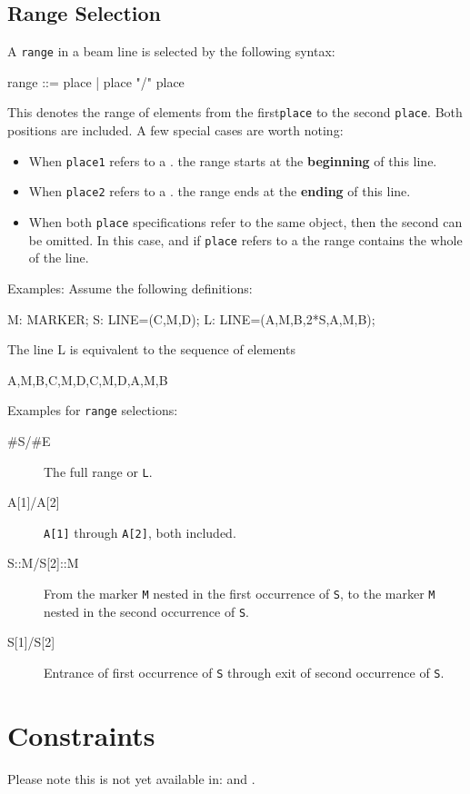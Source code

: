 \subsection{Range Selection}
\label{sec:arange}
A \texttt{range} in a beam line  is selected
by the following syntax:
\begin{example}
range ::= place |
          place "/" place
\end{example}
This denotes the range of elements from the first\texttt{place} to
the second \texttt{place}. Both positions are included.
A few special cases are worth noting:
\begin{itemize}
\item
When \texttt{place1} refers to a  .
the range starts at the \textbf{beginning} of this line.
\item
When \texttt{place2} refers to a  .
the range ends at the \textbf{ending} of this line.
\item
When both \texttt{place} specifications refer to the same object,
then the second can be omitted.
In this case, and if \texttt{place} refers to a
  the range contains the whole of the line.
\end{itemize}
\noindent Examples: Assume the following definitions:
\begin{example}
M: MARKER;
S: LINE=(C,M,D);
L: LINE=(A,M,B,2*S,A,M,B);
\end{example}
The line L is equivalent to the sequence of elements
\begin{example}
A,M,B,C,M,D,C,M,D,A,M,B
\end{example}
\noindent Examples for \texttt{range} selections:
\begin{description}
\item[\#S/\#E]
  The full range or \texttt{L}.
\item[{A[1]/A[2]}]
  \texttt{A[1]} through \texttt{A[2]}, both included.
\item[{S::M/S[2]::M}]
  From the marker \texttt{M} nested in the first occurrence of
  \texttt{S},
  to the marker \texttt{M} nested in the second occurrence of
  \texttt{S}.
\item[{S[1]/S[2]}]
  Entrance of first occurrence of \texttt{S} through
  exit of second occurrence of \texttt{S}.
\end{description}

\section{Constraints}
\label{sec:aconstraint}
Please note this is not yet available in:
\noopalt and \noopalcycl.

